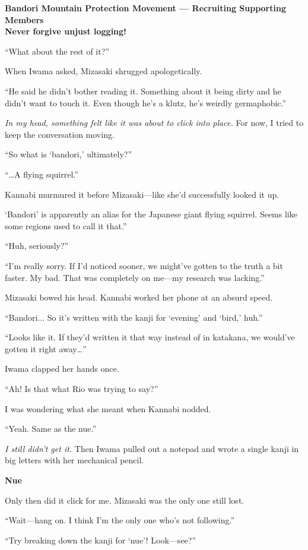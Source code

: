 \documentclass[
    a4paper,
    12pt,
    twoside,
    openany,
    UTF8,
    fontset=windows
]{ctexbook}
\begin{document}
\textbf{Bandori Mountain Protection Movement --- Recruiting Supporting Members}\\
\textbf{Never forgive unjust logging!}

``What about the rest of it?''

When Iwama asked, Mizasaki shrugged apologetically.

``He said he didn't bother reading it. Something about it being dirty and he didn't want to touch it. Even though he's a klutz, he's weirdly germaphobic.''

\textit{In my head, something felt like it was about to click into place.} For now, I tried to keep the conversation moving.

``So what is `bandori,' ultimately?''

``\dots A flying squirrel.''

Kannabi murmured it before Mizasaki---like she'd successfully looked it up.

`Bandori' is apparently an alias for the Japanese giant flying squirrel. Seems like some regions used to call it that.''

``Huh, seriously?''

``I'm really sorry. If I'd noticed sooner, we might've gotten to the truth a bit faster. My bad. That was completely on me---my research was lacking.''

Mizasaki bowed his head. Kannabi worked her phone at an absurd speed.

``Bandori... So it's written with the kanji for `evening' and `bird,' huh.''

``Looks like it. If they'd written it that way instead of in katakana, we would've gotten it right away\dots''

Iwama clapped her hands once.

``Ah! Is that what Rio was trying to say?''

I was wondering what she meant when Kannabi nodded.

``Yeah. Same as the nue.''

\textit{I still didn't get it.} Then Iwama pulled out a notepad and wrote a single kanji in big letters with her mechanical pencil.

\textbf{Nue}

Only then did it click for me. Mizasaki was the only one still lost.

``Wait---hang on. I think I'm the only one who's not following.''

``Try breaking down the kanji for `nue'! Look---see?''
\end{document}
